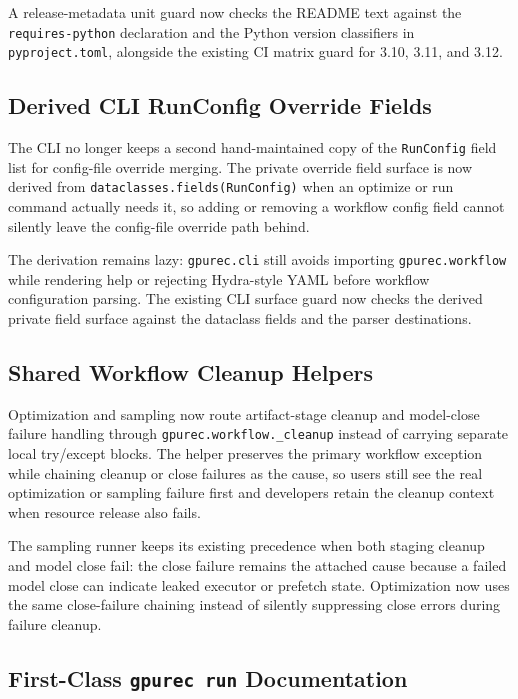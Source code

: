 \documentclass[11pt]{article}
\begin{document}
A release-metadata unit guard now checks the README text against the
\texttt{requires-python} declaration and the Python version classifiers in
\texttt{pyproject.toml}, alongside the existing CI matrix guard for 3.10, 3.11,
and 3.12.

\subsection{Derived CLI RunConfig Override Fields}

The CLI no longer keeps a second hand-maintained copy of the
\texttt{RunConfig} field list for config-file override merging.  The private
override field surface is now derived from \texttt{dataclasses.fields(RunConfig)}
when an optimize or run command actually needs it, so adding or removing a
workflow config field cannot silently leave the config-file override path behind.

The derivation remains lazy: \texttt{gpurec.cli} still avoids importing
\texttt{gpurec.workflow} while rendering help or rejecting Hydra-style YAML
before workflow configuration parsing.  The existing CLI surface guard now
checks the derived private field surface against the dataclass fields and the
parser destinations.

\subsection{Shared Workflow Cleanup Helpers}

Optimization and sampling now route artifact-stage cleanup and model-close
failure handling through \texttt{gpurec.workflow.\_cleanup} instead of carrying
separate local try/except blocks.  The helper preserves the primary workflow
exception while chaining cleanup or close failures as the cause, so users still
see the real optimization or sampling failure first and developers retain the
cleanup context when resource release also fails.

The sampling runner keeps its existing precedence when both staging cleanup and
model close fail: the close failure remains the attached cause because a failed
model close can indicate leaked executor or prefetch state.  Optimization now
uses the same close-failure chaining instead of silently suppressing close
errors during failure cleanup.

\subsection{First-Class \texttt{gpurec run} Documentation}
\end{document}
